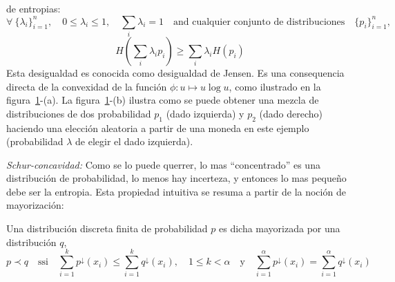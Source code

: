 \begin{propiedades}
  de entropias:
  \[
  \forall \: \{ \lambda_i \}_{i=1}^n, \quad  0 \le \lambda_i \le 1, \quad \sum_i
  \lambda_i = 1  \quad \mbox{and cualquier conjunto de  distribuciones} \quad \{
  p_i \}_{i=1}^n,
  \]
  \[
  H\left(  \sum_i  \lambda_i p_i  \right)  \ge  \sum_i  \lambda_i H(p_i)
  \]
  Esta desigualdad es conocida como  desigualdad de Jensen.  Es una consequencia
  directa de  la convexidad  de la funci\'on  $\phi: u  \mapsto u \log  u$, como
  ilustrado       en       la      figura~\ref{fig:SZ:Concavidad}-(a).        La
  figura~\ref{fig:SZ:Concavidad}-(b) ilustra como se puede obtener una mezcla de
  distribuciones  de  dos probabilidad  $p_1$  (dado  izquierda)  y $p_2$  (dado
  derecho)  haciendo una elecci\'on  aleatoria a  partir de  una moneda  en este
  ejemplo (probabilidad $\lambda$ de elegir el dado izquierda).\newline
  \begin{figure}[h!]
  \begin{center}  \end{center}
  \label{fig:SZ:Concavidad}
  \end{figure}
%
\setcounter{PropSchurConcavidad}{\value{enumi}}
\item\label{prop:SZ:Schurconcavidad}  {\it Schur-concavidad:}  Como se  lo puede
  querrer,  lo mas  ``concentrado'' es  una distribuci\'on  de  probabilidad, lo
  menos hay  incerteza, y entonces lo  mas peque\~no debe ser  la entropia. Esta
  propiedad intuitiva se resuma a partir de la noci\'on de mayorizaci\'on:
  \begin{definicion}[Mayorizaci\'on]\label{def:SZ:Mayorizacion}
    Una distribuci\'on  discreta finita de probabilidad $p$  es dicha mayorizada
    por una distribuci\'on $q$,
    \[
    p  \prec  q  \quad   \mbox{ssi}  \quad  \sum_{i=1}^k  p^\downarrow(x_i)  \le
    \sum_{i=1}^k q^\downarrow(x_i), \quad 1 \le  k < \alpha \quad \mbox{y} \quad
    \sum_{i=1}^\alpha p^\downarrow(x_i)  = \sum_{i=1}^\alpha q^\downarrow(x_i)
\]
\end{definicion}
\end{propiedades}
